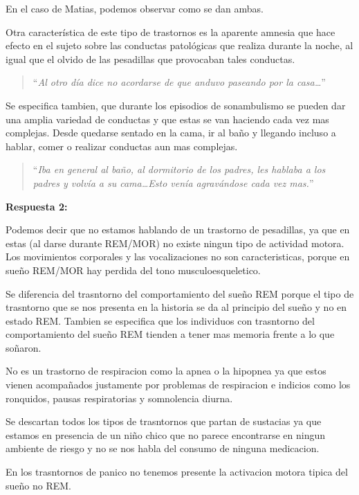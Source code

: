 \documentclass[12pt,a4paper]{article}
\begin{document}
En el caso de Matias, podemos observar como se dan ambas. 

Otra característica de este tipo de trastornos es la aparente amnesia que hace efecto en el sujeto sobre las conductas patológicas que realiza durante la noche, al igual que el olvido de las pesadillas que provocaban tales conductas. 

\begin{quote}
    \enquote{\textit{Al otro día dice no acordarse de que anduvo paseando por la casa\ldots}}
\end{quote}

Se especifica tambien, que durante los episodios de sonambulismo se pueden dar una amplia variedad de conductas y que estas se van haciendo cada vez mas complejas. Desde quedarse sentado en la cama, ir al baño y llegando incluso a hablar, comer o realizar conductas aun mas complejas. 

\begin{quote}
    \enquote{\textit{Iba en general al baño, al dormitorio de los padres, les hablaba a los padres y volvía a su cama\ldots Esto venía agravándose cada vez mas.}}
\end{quote}

\textbf{Respuesta 2:}

Podemos decir que no estamos hablando de un trastorno de pesadillas, ya que en estas (al darse durante REM/MOR) no existe ningun tipo de actividad motora. Los movimientos corporales y las vocalizaciones no son caracteristicas, porque en sueño REM/MOR hay perdida del tono musculoesqueletico. 

Se diferencia del trasntorno del comportamiento del sueño REM porque el tipo de trasntorno que se nos presenta en la historia se da al principio del sueño y no en estado REM. Tambien se especifica que los individuos con trasntorno del comportamiento del sueño REM tienden a tener mas memoria frente a lo que soñaron.

No es un trastorno de respiracion como la apnea o la hipopnea ya que estos vienen acompañados justamente por problemas de respiracion e indicios como los ronquidos, pausas respiratorias y somnolencia diurna. 

Se descartan todos los tipos de trasntornos que partan de sustacias ya que estamos en presencia de un niño chico que no parece encontrarse en ningun ambiente de riesgo y no se nos habla del consumo de ninguna medicacion. 

En los trasntornos de panico no tenemos presente la activacion motora tipica del sueño no REM. 
\end{document}
